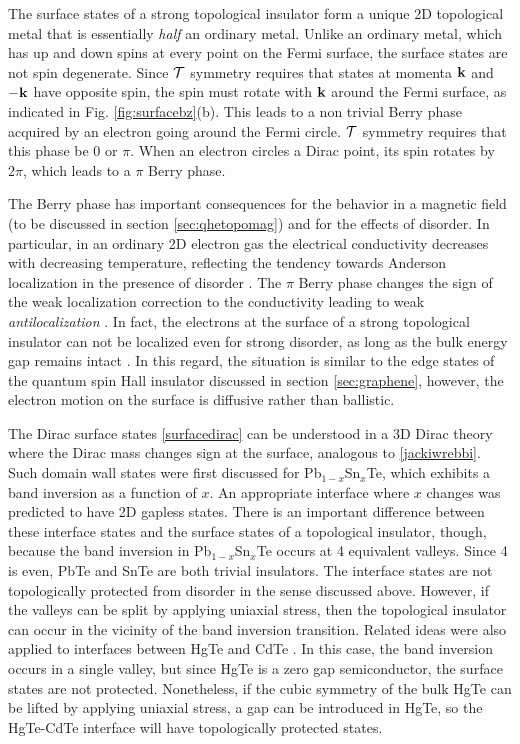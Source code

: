 \documentclass[twocolumn,floatfix,showpacs,rmp,aps]{revtex4}
\begin{document}
The surface states of a strong topological insulator form a unique
2D topological metal \cite{fukanemele07,fukane07} that is essentially {\it half}
an ordinary metal.  Unlike an ordinary metal,
which has up and down spins at every point on the Fermi surface, the surface
states are not spin degenerate.  Since ${\cal T}$ symmetry requires that states at
momenta ${\bf k}$ and $-{\bf k}$ have opposite spin, the spin must rotate with
${\bf k}$ around the Fermi surface, as indicated in Fig.
\ref{fig:surfacebz}(b).  This leads to a non trivial Berry phase
acquired by an electron going around the Fermi
circle.  ${\cal T}$ symmetry requires that this phase be $0$ or
$\pi$.  When an electron circles a Dirac point, its spin rotates by
$2\pi$, which leads to a $\pi$ Berry phase.

The Berry phase has
important consequences for the behavior in a magnetic field (to be
discussed in section \ref{sec:qhetopomag}) and for the effects of disorder.  In
particular, in an ordinary 2D electron gas the electrical
conductivity decreases with decreasing temperature, reflecting the
tendency towards Anderson localization in the presence of disorder \cite{lee85}.
The $\pi$ Berry
phase changes the sign of the weak localization correction to the
conductivity leading to weak {\it antilocalization} \cite{suzuura02}.  In fact, the
electrons at the surface of a strong topological insulator can not be
localized even for strong disorder, as long as the bulk energy gap
remains intact \cite{nomura07}.  In this regard, the situation is similar to the edge states of the
quantum spin Hall insulator discussed in section \ref{sec:graphene}, however,
the electron motion on the surface is diffusive rather than ballistic.

The Dirac surface states \eqref{surfacedirac} can be
understood in a 3D Dirac theory\cite{qihugheszhang08} where the Dirac mass changes sign at the
surface, analogous to \eqref{jackiwrebbi}.  Such domain wall states were first
discussed for Pb$_{1-x}$Sn$_x$Te\cite{volkov85,fradkin86},
which exhibits a band inversion as a function of
$x$.  An appropriate interface where $x$ changes was
predicted to have 2D gapless states.  There is an important difference
between these interface states and the surface
states of a topological insulator, though, because the band inversion in
Pb$_{1-x}$Sn$_x$Te occurs at 4 equivalent valleys.  Since 4 is even, PbTe and SnTe are
both trivial insulators.  The interface states are not
topologically protected from disorder in the sense discussed above.
However, if the valleys can be split by applying uniaxial stress, then
the topological insulator can occur in the vicinity of the band inversion
transition\cite{fukane07}.
Related ideas were also applied to interfaces between HgTe and CdTe
\cite{chang85,cade85,linliu85,pankratovpakhomov87}.
In this case, the band inversion occurs in a single valley, but since
HgTe is a zero gap semiconductor, the surface states are not
protected.  Nonetheless, if the cubic symmetry of the bulk HgTe can
be lifted by applying uniaxial stress, a gap can be introduced in HgTe,
so the HgTe-CdTe interface will have topologically protected states\cite{fukane07}.
\end{document}
